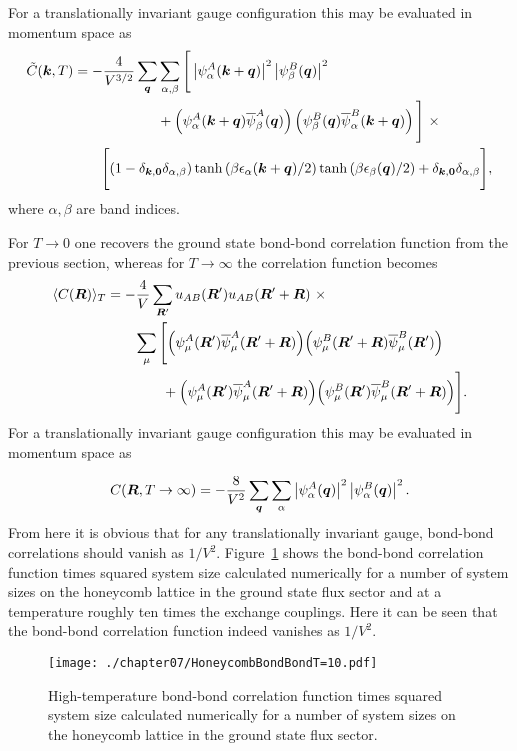 %
For a translationally invariant gauge configuration this may be evaluated in momentum space as\newpage
%
\begin{align}
	\tilde{C}(\bm{k}, T) &= -\frac{4}{V^{3/2}} \sum_{\bm{q}} \sum_{\alpha,\beta} \Bigg[ \left|\psi_{\alpha}^A(\bm{k} + \bm{q})\right|^2 \left|\psi_{\beta}^B(\bm{q})\right|^2 \nonumber\\
	&\qquad\qquad\qquad+ \left(\psi_{\alpha}^A(\bm{k} + \bm{q}) \overline{\psi}_{\beta}^A(\bm{q})\right) \left(\psi_{\beta}^B(\bm{q}) \overline{\psi}_{\alpha}^B(\bm{k} + \bm{q})\right) \Bigg]~\times \nonumber\\
								&\qquad\Bigg[ (1 - \delta_{\bm{k},\bm{0}}\delta_{\alpha,\beta}) \tanh{\left(\beta \epsilon_\alpha(\bm{k}+\bm{q})/2\right)} \tanh{\left(\beta \epsilon_\beta(\bm{q})/2\right)} + \delta_{\bm{k},\bm{0}}\delta_{\alpha,\beta} \Bigg],
\end{align}
%
where $\alpha,\beta$ are band indices.

For $T\rightarrow 0$ one recovers the ground state bond-bond correlation function from the previous section, whereas for $T\rightarrow \infty$ the correlation function becomes
%
\begin{align}
	\langle C(\bm{R}) \rangle_T	&= -\frac{4}{V} \sum_{\bm{R}'} u_{AB}(\bm{R}') u_{AB}(\bm{R}' + \bm{R})~\times \nonumber\\
					&\qquad\sum_{\mu} \Bigg[\Big(\psi_{\mu}^A(\bm{R}') \overline{\psi}_{\mu}^A(\bm{R}' + \bm{R})\Big) \Big(\psi_{\mu}^B(\bm{R}' + \bm{R}) \overline{\psi}_{\mu}^B(\bm{R}') \Big) \nonumber\\
					&\qquad\qquad+ \Big(\psi_{\mu}^A(\bm{R}') \overline{\psi}_{\mu}^A(\bm{R}' + \bm{R})\Big) \Big(\psi_{\mu}^B(\bm{R}') \overline{\psi}_{\mu}^B(\bm{R}' + \bm{R}) \Big)\Bigg].
\end{align}
%
For a translationally invariant gauge configuration this may be evaluated in momentum space as

%
\begin{equation}
	C(\bm{R}, T\rightarrow\infty) = -\frac{8}{V^2} \sum_{\bm{q}} \sum_{\alpha} \left|\psi_{\alpha}^A(\bm{q}) \right|^2 \left|\psi_{\alpha}^B(\bm{q}) \right|^2.
\end{equation}
%
From here it is obvious that for any translationally invariant gauge, bond-bond correlations should vanish as $1/V^2$.
Figure~\ref{fig:chapter07_6_3BondBondHighTemp} shows the bond-bond correlation function times squared system size calculated numerically for a number of system sizes on the honeycomb lattice in the ground state flux sector and at a temperature roughly ten times the exchange couplings.
Here it can be seen that the bond-bond correlation function indeed vanishes as $1/V^2$.
%
\begin{figure}[tb]
	\centering
	\texttt{[image: ./chapter07/HoneycombBondBondT=10.pdf]}
	\caption{
		High-temperature bond-bond correlation function times squared system size calculated numerically for a number of system sizes on the honeycomb lattice in the ground state flux sector.
	}
	\label{fig:chapter07_6_3BondBondHighTemp}
\end{figure}
%

